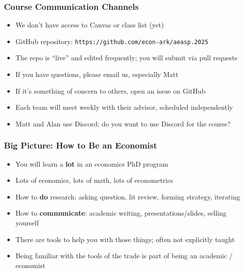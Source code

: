 \documentclass[aspectratio=169]{beamer}
\begin{document}

\begin{frame}
\frametitle{Course Communication Channels}
\begin{itemize}
	\item We don't have access to Canvas or class list (yet)
	
	\item GitHub repository: \texttt{https://github.com/econ-ark/aeasp.2025}
	
	\item The repo is ``live'' and edited frequently; you will submit via pull requests
	
	\item <2->If you have questions, please email us, especially Matt
	
	\item <2->If it's something of concern to others, open an issue on GitHub
	
	\item <2->Each team will meet weekly with their advisor, scheduled independently
	
	\item <3->Matt and Alan use Discord; do you want to use Discord for the course?
\end{itemize}
\end{frame}


\begin{frame}
\frametitle{Big Picture: How to Be an Economist}
\begin{itemize}
	\item You will learn a \textbf{lot} in an economics PhD program
	
	\item Lots of economics, lots of math, lots of econometrics
	
	\item <2->How to \textbf{do} research: asking question, lit review, forming strategy, iterating
	
	\item <2->How to \textbf{communicate}: academic writing, presentations/slides, selling yourself
	
	\item <3->There are tools to help you with those things; often not explicitly taught
	
	\item <3->Being familiar with the tools of the trade is part of being an academic / economist
\end{itemize}
\end{frame}
\end{document}
